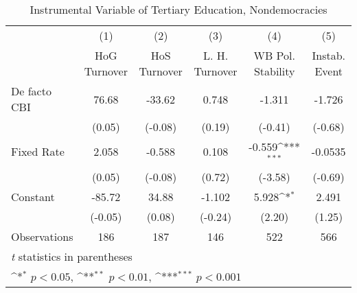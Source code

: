 \begin{table}[htbp]\centering
\def\sym#1{\ifmmode^{#1}\else\(^{#1}\)\fi}
\caption{Instrumental Variable of Tertiary Education, Nondemocracies \label{ndemIfivs2}}
\begin{tabular}{l*{5}{c}}
\toprule
                                        &\multicolumn{1}{c}{(1)}&\multicolumn{1}{c}{(2)}&\multicolumn{1}{c}{(3)}&\multicolumn{1}{c}{(4)}&\multicolumn{1}{c}{(5)}\\
                                        &\multicolumn{1}{c}{HoG Turnover}&\multicolumn{1}{c}{HoS Turnover}&\multicolumn{1}{c}{L. H. Turnover}&\multicolumn{1}{c}{WB Pol. Stability}&\multicolumn{1}{c}{Instab. Event}\\
\midrule
De facto CBI                            &    76.68         &   -33.62         &    0.748         &   -1.311         &   -1.726         \\
                                        &   (0.05)         &  (-0.08)         &   (0.19)         &  (-0.41)         &  (-0.68)         \\
\addlinespace
Fixed Rate                              &    2.058         &   -0.588         &    0.108         &   -0.559\sym{***}&  -0.0535         \\
                                        &   (0.05)         &  (-0.08)         &   (0.72)         &  (-3.58)         &  (-0.69)         \\
\addlinespace
Constant                                &   -85.72         &    34.88         &   -1.102         &    5.928\sym{*}  &    2.491         \\
                                        &  (-0.05)         &   (0.08)         &  (-0.24)         &   (2.20)         &   (1.25)         \\
\midrule
Observations                            &      186         &      187         &      146         &      522         &      566         \\
\bottomrule
\multicolumn{6}{l}{\footnotesize \textit{t} statistics in parentheses}\\
\multicolumn{6}{l}{\footnotesize \sym{*} \(p<0.05\), \sym{**} \(p<0.01\), \sym{***} \(p<0.001\)}\\
\end{tabular}
\end{table}
